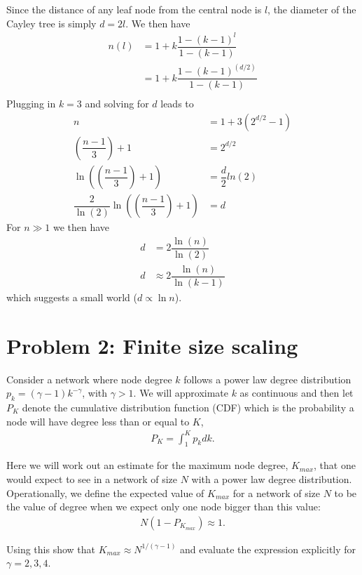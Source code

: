 \documentclass{tufte-handout}
\begin{document}
Since the distance of any leaf node from the central node is $l$, the diameter of the Cayley tree is simply $d = 2l$. We then have
\begin{align*}
n(l) &= 1 + k \dfrac{1-(k-1)^l}{1-(k-1)} \\
     &= 1 + k \dfrac{1-(k-1)^{(d/2)}}{1-(k-1)} \\
\end{align*}
Plugging in $k=3$ and solving for $d$ leads to
\begin{align*}
n &= 1 + 3 (2 ^{d/2} - 1) \\
(\dfrac{n - 1}{3}) + 1 &= 2 ^{d/2} \\
\ln((\dfrac{n - 1}{3}) + 1) &= \dfrac{d}{2} ln(2) \\
\dfrac{2}{\ln{(2)}} \ln((\dfrac{n - 1}{3}) + 1) &= d
\end{align*}
For $n \gg 1$ we then have
\begin{align*}
d &= 2 \dfrac{\ln(n)}{\ln{(2)}}  \\
d & \approx 2 \dfrac{\ln(n)}{\ln{(k-1)}}
\end{align*}
which suggests a small world ($d \propto \ln{n}$).

\section{Problem 2: Finite size scaling}

Consider a network where node degree $k$ follows a power law degree distribution $p_k = (\gamma - 1)k^{-\gamma}$, with $\gamma > 1$. We will approximate $k$ as continuous and then let $P_K$ denote the cumulative distribution function (CDF) which is the probability a node will have degree less than or equal to $K$,
\begin{align*}
P_K = \int_1^K p_k dk.
\end{align*}

Here we will work out an estimate for the maximum node degree, $K_{max}$, that one would expect to see in a network of size $N$ with a power law degree distribution. Operationally, we define the expected value of $K_{max}$ for a network of size $N$ to be the value of degree when we expect only one node bigger than this value:
\begin{align*}
N (1 - P_{K_{max}} ) \approx 1.
\end{align*}

Using this show that $K_{max} \approx N^{1/(\gamma-1)}$ and evaluate the expression explicitly for $\gamma = 2,3,4$.
\end{document}
